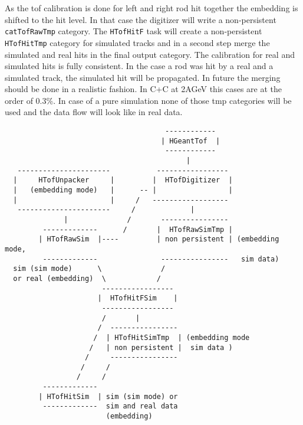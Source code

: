 As the tof calibration is done for left and right rod hit together the embedding 
is shifted to the hit level. In that case the digitizer will write a non-persistent 
\verb+catTofRawTmp+ category. The \verb+HTofHitF+ task will create a non-persistent 
\verb+HTofHitTmp+ category for simulated tracks and in a second step merge the 
simulated and real hits in the final output category. The calibration for real 
and simulated hits is fully consistent. In the case a rod was hit by a real and 
a simulated track, the simulated hit will be propagated. In future the merging 
should be done in a realistic fashion. In C+C at 2AGeV this cases are at the order 
of 0.3\%. In case of a pure simulation none of those tmp categories will be used 
and the data flow will look like in real data.
\begin{lstlisting}
                                      ------------                      
                                     | HGeantTof  |                     
                                      ------------                      
                                           |                            
   ----------------------           -----------------                   
  |     HTofUnpacker     |         |  HTofDigitizer  |                  
  |   (embedding mode)   |      -- |                 |                  
  |                      |     /   ------------------                   
   ----------------------     /             |                           
              |              /       ----------------                   
         -------------      /       |  HTofRawSimTmp |                  
        | HTofRawSim  |----         | non persistent | (embedding mode, 
         -------------               ----------------   sim data)       
  sim (sim mode)      \              /                                  
  or real (embedding)  \            /                                   
                       -----------------                                
                      |  HTofHitFSim    |                               
                       -----------------                                
                       /       |                                        
                      /  ----------------                               
                     /  | HTofHitSimTmp  | (embedding mode              
                    /   | non persistent |  sim data )                  
                   /     ----------------                               
                  /     /                                               
                 /     /                                                
         -------------                                                  
        | HTofHitSim  | sim (sim mode) or                               
         -------------  sim and real data                               
                        (embedding)                                     
                                                                        

\end{lstlisting}
